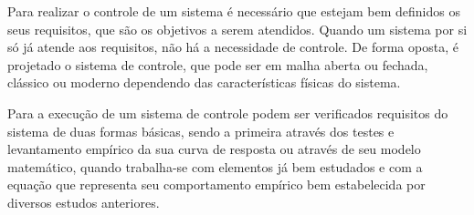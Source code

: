 Para realizar o controle de um sistema é necessário que estejam bem definidos os seus requisitos, que são os objetivos a serem atendidos. Quando um sistema por si só já atende aos requisitos, não há a necessidade de controle. De forma oposta, é projetado o sistema de controle, que pode ser em malha aberta ou fechada, clássico ou moderno dependendo das características físicas do sistema. 

Para a execução de um sistema de controle podem ser verificados requisitos do sistema de duas formas básicas, sendo a primeira através dos testes e levantamento empírico da sua curva de resposta ou através de seu modelo matemático, quando trabalha-se com elementos já bem estudados e com a equação que representa seu comportamento empírico bem estabelecida por diversos estudos anteriores.



\newpage


